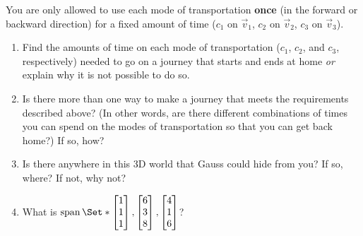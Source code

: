 \documentclass{problemset}
\DeclareMathOperator{\Span}{span}
\newcommand{\mat}[1]{\begin{bmatrix*}[r]#1\end{bmatrix*}}
\begin{document}
\begin{iola}
You are only allowed to use each mode of transportation \textbf{once}
(in the forward or backward direction) for a fixed amount of time ($c_1$
on $\vec v_1$, $c_2$ on $\vec v_2$, $c_3$ on $\vec v_3$).

\vspace{5mm}


\begin{enumerate}
	\item  Find the amounts of time on each mode of transportation ($c_1$, $c_2$,
		and $c_3$, respectively) needed to go on a journey that starts and ends
		at home \emph{or} explain why it is not possible to do so.

	\item Is there more than one way to make a journey that meets the
		requirements described above? (In other words, are there different
		combinations of times you can spend on the modes of transportation so
		that you can get back home?) If so, how?

	\item Is there anywhere in this 3D world that Gauss
		could hide from you? If so, where? If not, why not?

	\item What is $\Span\Set*{\mat{1\\1\\1},\mat{6\\3\\8},\mat{4\\1\\6}}$?

\end{enumerate}
\end{iola}
\end{document}
